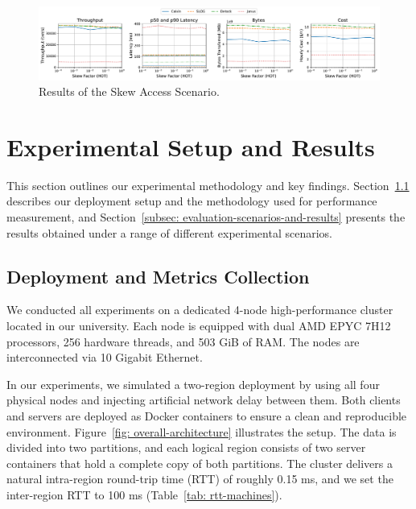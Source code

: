 \documentclass{article}
\begin{document}
\begin{figure}[t]
    \centering
    \includegraphics[width=1\textwidth]{figures/Skew.pdf}
    \caption{Results of the Skew Access Scenario.}
    \label{fig: skew-access-scenario}
\end{figure}

\section{Experimental Setup and Results}
\label{sec: experimental-setup-and-results}
This section outlines our experimental methodology and key findings. Section~\ref{subsec: deployment-and-metrics-collection} describes our deployment setup and the methodology used for performance measurement, and Section~\ref{subsec: evaluation-scenarios-and-results} presents the results obtained under a range of different experimental scenarios.

\subsection{Deployment and Metrics Collection}
\label{subsec: deployment-and-metrics-collection}
We conducted all experiments on a dedicated 4-node high-performance cluster located in our university. Each node is equipped with dual AMD EPYC 7H12 processors, 256 hardware threads, and 503 GiB of RAM. The nodes are interconnected via 10 Gigabit Ethernet.

In our experiments, we simulated a two-region deployment by using all four physical nodes and injecting artificial network delay between them. Both clients and servers are deployed as Docker containers to ensure a clean and reproducible environment. Figure~\ref{fig: overall-architecture} illustrates the setup. The data is divided into two partitions, and each logical region consists of two server containers that hold a complete copy of both partitions. The cluster delivers a natural intra-region round-trip time (RTT) of roughly 0.15 ms, and we set the inter-region RTT to 100 ms (Table~\ref{tab: rtt-machines}).
\end{document}
